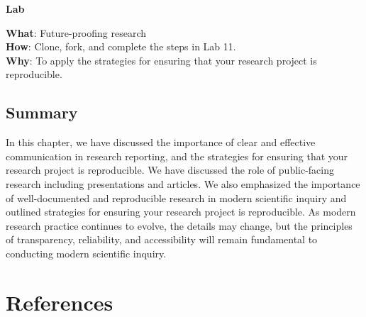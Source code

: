 \documentclass[
  letterpaper,
  krantz1]{latex/krantz-mod}
\theoremstyle{definition}
\theoremstyle{definition}
\theoremstyle{remark}
\begin{document}
\begin{tcolorbox}[enhanced jigsaw, toprule=.15mm, breakable, colback=white, arc=.35mm, left=2mm, colframe=quarto-callout-color-frame, opacityback=0, bottomrule=.15mm, rightrule=.15mm, leftrule=.75mm]

\textbf{ Lab}

\textbf{What}: Future-proofing research\\
\textbf{How}: Clone, fork, and complete the steps in Lab 11.\\
\textbf{Why}: To apply the strategies for ensuring that your research
project is reproducible.

\end{tcolorbox}

\section*{Summary}\label{summary-10}


In this chapter, we have discussed the importance of clear and effective
communication in research reporting, and the strategies for ensuring
that your research project is reproducible. We have discussed the role
of public-facing research including presentations and articles. We also
emphasized the importance of well-documented and reproducible research
in modern scientific inquiry and outlined strategies for ensuring your
research project is reproducible. As modern research practice continues
to evolve, the details may change, but the principles of transparency,
reliability, and accessibility will remain fundamental to conducting
modern scientific inquiry.


\chapter*{References}\label{references}

\end{document}
